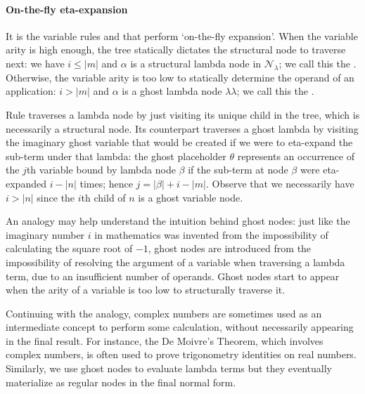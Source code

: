 \documentclass{elsarticle}
\theoremstyle{plain}
\theoremstyle{definition}
\theoremstyle{remark}
\newcommand\Nodes{\mathcal{N}}%
\newcommand\NodesLmd{\Nodes_\lambda}%
\newcommand{\ghostlmd}{{\lambda\!\!\lambda}}
\newcommand{\ghostvar}{\theta}
\newcommand{\ExternalNodes}{\Nodes^{\sf ext}}
\begin{document}


\paragraph{On-the-fly eta-expansion}
It is the variable rules  and  that perform `on-the-fly expansion'. When the variable arity is high enough, the tree statically dictates the structural node to traverse next: we have $i \leq |m|$ and $\alpha$ is a structural lambda node in $\NodesLmd$; we call this the . Otherwise, the variable arity is too low to statically determine the operand of an application: $i > |m|$ and $\alpha$ is a ghost lambda node $\ghostlmd$; we call this the .

Rule  traverses a lambda node by just visiting its unique child  in the tree, which is necessarily a structural node. Its counterpart \rulenamet{Lam^\ghostvar} traverses a ghost lambda by visiting the imaginary ghost variable that would be created if we were to eta-expand the sub-term under that lambda: the ghost placeholder $\ghostvar$ represents an occurrence of the $j$th variable bound by lambda node $\beta$ if the sub-term at node $\beta$ were eta-expanded $i-|n|$ times; hence $j = |\beta| + i - |m|$.
Observe that we necessarily have $i>|n|$ since the $i$th child of $n$ is a ghost variable node.

An analogy may help understand the intuition behind ghost nodes:
just like the imaginary number $i$ in mathematics was invented from the impossibility of calculating the square root of $-1$, ghost nodes are introduced from the impossibility of resolving the argument of a variable when traversing a lambda term, due to an insufficient number of operands. Ghost nodes start to appear when the arity of a variable is too low to structurally traverse it.

Continuing with the analogy, complex numbers are sometimes used as an intermediate concept to perform some calculation, without necessarily appearing in the final result. For instance, the De Moivre's Theorem, which involves complex numbers, is often used to prove trigonometry identities on real numbers. Similarly, we use ghost nodes to evaluate lambda terms but they eventually materialize as regular nodes in the final normal form.
\end{document}
